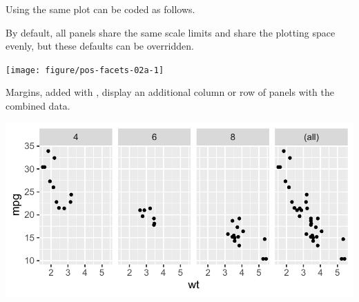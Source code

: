 \documentclass[krantz2]{krantz}\usepackage{knitr}
\begin{document}
Using  the same plot can be coded as follows.

\begin{knitrout}\footnotesize
{}\color{fgcolor}\begin{kframe}
\begin{alltt}
 \hlopt{+} \hlstd{(} \hlstd{=}   \hlstd{=} \hlstd{)}
\end{alltt}
\end{kframe}
\end{knitrout}

By default, all panels share the same scale limits and share the plotting space evenly, but these defaults can be overridden.

\begin{knitrout}\footnotesize
{}\color{fgcolor}\begin{kframe}
\begin{alltt}
 \hlopt{+} \hlstd{(} \hlstd{=}   \hlstd{=} \hlstd{,}  \hlstd{=} \hlstd{)}
\end{alltt}
\end{kframe}

{\centering \texttt{[image: figure/pos-facets-02a-1]} 

}


\end{knitrout}



Margins, added with , display an additional column or row of panels with the combined data.

\begin{knitrout}\footnotesize
{}\color{fgcolor}\begin{kframe}
\begin{alltt}
 \hlopt{+} \hlstd{(} \hlstd{=}   \hlstd{=} \hlstd{)}
\end{alltt}
\end{kframe}

{\centering \includegraphics[width=.7\textwidth]{figure/pos-facets-06-1} 

}


\end{knitrout}
\end{document}
